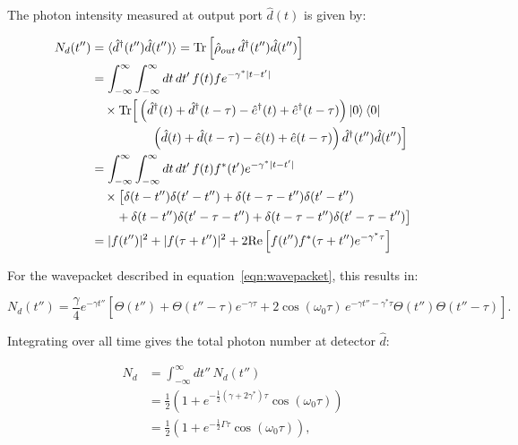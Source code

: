 The photon intensity measured at output port $\hat{d}(t)$ is given by:

\begin{equation}
\begin{aligned}
    N_d(t'') 
    &= \langle \hat{d}^{\dagger}(t'') \hat{d}(t'') \rangle 
    = \text{Tr}\left[\hat{\rho}_{out} \, \hat{d}^{\dagger}(t'') \hat{d}(t'')\right] \\
    &= \int_{-\infty}^{\infty} \int_{-\infty}^{\infty} dt \, dt' \, f(t) f e^{-\gamma^*|t - t'|} \\
    &\quad \times \text{Tr} \Big[ 
        \left( \hat{d}^{\dagger}(t) + \hat{d}^{\dagger}(t - \tau) 
              - \hat{e}^{\dagger}(t) + \hat{e}^{\dagger}(t - \tau) \right) 
        \ket{0} \bra{0} \\
    &\hspace{1.7cm}
         \left( \hat{d}(t) + \hat{d}(t - \tau) 
              - \hat{e}(t) + \hat{e}(t - \tau) \right)
        \hat{d}^{\dagger}(t'') \hat{d}(t'') 
    \Big] \\
    &= \int_{-\infty}^{\infty} \int_{-\infty}^{\infty} dt \, dt' \, f(t) f^*(t') e^{-\gamma^*|t - t'|} \\
    &\quad \times \big[ 
        \delta(t - t'') \delta(t' - t'') 
        + \delta(t - \tau - t'') \delta(t' - t'') \\
    &\qquad 
        + \delta(t - t'') \delta(t' - \tau - t'') 
        + \delta(t - \tau - t'') \delta(t' - \tau - t'') 
    \big] \\
    &= |f(t'')|^2 + |f(\tau+t'')|^2 + 2\text{Re}\left[f(t'')f^*(\tau+t'')e^{-\gamma^* \tau } \right]\\
\end{aligned}
\end{equation}

For the wavepacket described in equation~\ref{eqn:wavepacket}, this results in:

\begin{equation}
    N_d(t'') = \frac{\gamma}{4} e^{-\gamma t''} \left[\Theta(t'') + \Theta(t'' - \tau) e^{-\gamma \tau} + 2 \cos(\omega_0 \tau)\, e^{-\gamma t'' - \gamma^* \tau} \Theta(t'') \Theta(t'' - \tau) \right].
\end{equation}

Integrating over all time gives the total photon number at detector $\hat{d}$:

\begin{equation}
\begin{aligned}
    N_d &= \int_{-\infty}^{\infty} dt''\, N_d(t'') \\
        &= \frac{1}{2} \left(1 + e^{-\frac{1}{2}(\gamma + 2\gamma^*) \tau} \cos(\omega_0 \tau) \right) \\
        &= \frac{1}{2} \left(1 + e^{-\frac{1}{2} \Gamma \tau} \cos(\omega_0 \tau) \right),
        \label{eqn:int-decay}
\end{aligned}
\end{equation}


